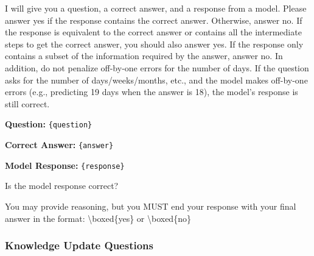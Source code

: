 \begin{tcolorbox}[
    colback=teal!5!white,
    colframe=teal!60!black,
    title=Judge Prompt: Temporal Reasoning Questions,
    fonttitle=\bfseries,
    coltitle=white,
    colbacktitle=teal!60!black,
    boxrule=1.0pt,
    arc=1.5mm,
    enhanced,
    breakable
]
\small
I will give you a question, a correct answer, and a response from a model. Please answer yes if the response contains the correct answer. Otherwise, answer no. If the response is equivalent to the correct answer or contains all the intermediate steps to get the correct answer, you should also answer yes. If the response only contains a subset of the information required by the answer, answer no. In addition, do not penalize off-by-one errors for the number of days. If the question asks for the number of days/weeks/months, etc., and the model makes off-by-one errors (e.g., predicting 19 days when the answer is 18), the model's response is still correct.

\vspace{0.2cm}

\textbf{Question:} \texttt{\{question\}}

\textbf{Correct Answer:} \texttt{\{answer\}}

\textbf{Model Response:} \texttt{\{response\}}

\vspace{0.2cm}

Is the model response correct?

You may provide reasoning, but you MUST end your response with your final answer in the format: \textbackslash boxed\{yes\} or \textbackslash boxed\{no\}
\end{tcolorbox}

\subsubsection{Knowledge Update Questions}

